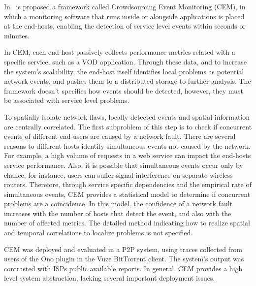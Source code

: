 In~\cite{crowdsourcing_service_level_network_event_monitoring} is proposed a
framework called Crowdsourcing Event Monitoring (CEM), in which a
monitoring software that runs inside or alongside applications is placed at the
end-hosts, enabling the detection of service level events within seconds or
minutes.

In CEM, each end-host passively collects performance metrics related with a
specific service, such as a VOD application.
Through these data, and to increase the system's scalability,
the end-host itself identifies local problems as
potential network events, and pushes them to a distributed storage to further
analysis.
The framework doesn't specifies how events should be detected,
however, they must be associated with service level problems.

To spatially isolate network flaws, locally detected events and spatial
information are centrally correlated.
The first subproblem of this step is to check if concurrent events
of different end-users are caused by a
network fault. There are several reasons to different hosts identify
simultaneous events not caused by the network.
For example, a high volume of requests in a web service can impact the end-hosts
service performance. Also, it is
possible that simultaneous events occur only by chance, for instance, users
can suffer signal interference on separate wireless routers.
Therefore, through service specific dependencies and the empirical rate of
simultaneous
events, CEM provides a statistical model to determine if
concurrent problems are a coincidence.
In this model, the confidence of a network fault increases with the
number of hosts that detect the event, and also with the number of affected
metrics.
The detailed method indicating how to realize spatial and temporal
correlations to
localize problems is not specified.

CEM was deployed and evaluated in a P2P system, using traces
collected
from users of the Ono plugin in the Vuze BitTorrent client. The system's
output was contrasted with ISPs public available reports. In general,
CEM provides a high level system abstraction, lacking several
important deployment issues.
